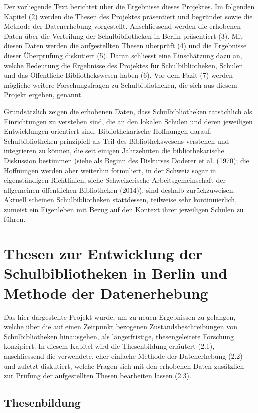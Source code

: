 \documentclass[a4paper,
fontsize=11pt,
oneside,
numbers=noperiodatend,
parskip=half-,
bibliography=totoc,
final
]{scrartcl}
\begin{document}
Der vorliegende Text berichtet über die Ergebnisse dieses Projektes. Im
folgenden Kapitel (2) werden die Thesen des Projektes präsentiert und
begründet sowie die Methode der Datenerhebung vorgestellt. Anschliessend
werden die erhobenen Daten über die Verteilung der Schulbibliotheken in
Berlin präsentiert (3). Mit diesen Daten werden die aufgestellten Thesen
überprüft (4) und die Ergebnisse dieser Überprüfung diskutiert (5).
Daran schliesst eine Einschätzung dazu an, welche Bedeutung die
Ergebnisse des Projektes für Schulbibliotheken, Schulen und das
Öffentliche Bibliothekswesen haben (6). Vor dem Fazit (7) werden
mögliche weitere Forschungsfragen zu Schulbibliotheken, die sich aus
diesem Projekt ergeben, genannt.

Grundsätzlich zeigen die erhobenen Daten, dass Schulbibliotheken
tatsächlich als Einrichtungen zu verstehen sind, die an den lokalen
Schulen und deren jeweiligen Entwicklungen orientiert sind.
Bibliothekarische Hoffnungen darauf, Schulbibliotheken prinzipiell als
Teil des Bibliothekswesens verstehen und integrieren zu können, die seit
einigen Jahrzehnten die bibliothekarische Diskussion bestimmen (siehe
als Beginn des Diskurses Doderer et al. (1970); die Hoffnungen werden
aber weiterhin formuliert, in der Schweiz sogar in eigenständigen
Richtlinien, siehe Schweizerische Arbeitsgemeinschaft der allgemeinen
öffentlichen Bibliotheken (2014)), sind deshalb zurückzuweisen. Aktuell
scheinen Schulbibliotheken stattdessen, teilweise sehr kontinuierlich,
zumeist ein Eigenleben mit Bezug auf den Kontext ihrer jeweiligen
Schulen zu führen.

\section{Thesen zur Entwicklung der Schulbibliotheken in Berlin
und Methode der
Datenerhebung}\label{thesen-zur-entwicklung-der-schulbibliotheken-in-berlin-und-methode-der-datenerhebung}

Das hier dargestellte Projekt wurde, um zu neuen Ergebnissen zu
gelangen, welche über die auf einen Zeitpunkt bezogenen
Zustandsbeschreibungen von Schulbibliotheken hinausgehen, als
längerfristige, thesengeleitete Forschung konzipiert. In diesem Kapitel
wird die Thesenbildung erläutert (2.1), anschliessend die verwendete,
eher einfache Methode der Datenerhebung (2.2) und zuletzt diskutiert,
welche Fragen sich mit den erhobenen Daten zusätzlich zur Prüfung der
aufgestellten Thesen bearbeiten lassen (2.3).

\subsection{Thesenbildung}\label{thesenbildung}
\end{document}
